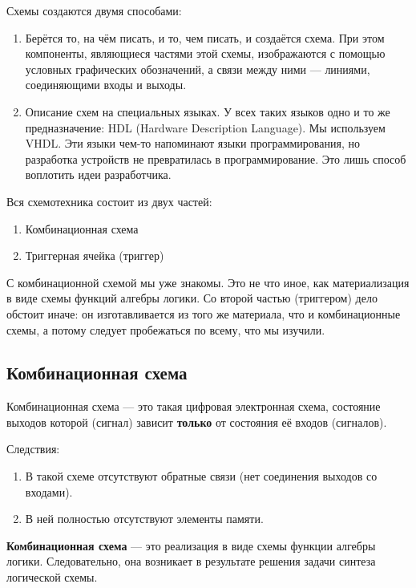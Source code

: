 \documentclass[12px]{article}
\begin{document}
Схемы создаются двумя способами:
\begin{enumerate}
	\item Берётся то, на чём писать, и то, чем писать, и создаётся схема. При этом компоненты, являющиеся частями этой схемы, изображаются с помощью условных графических обозначений, а связи между ними — линиями, соединяющими входы и выходы.
	\item Описание схем на специальных языках. У всех таких языков одно и то же предназначение: HDL (Hardware Description Language). Мы используем VHDL. Эти языки чем-то напоминают языки программирования, но разработка устройств не превратилась в программирование. Это лишь способ воплотить идеи разработчика.
\end{enumerate}

Вся схемотехника состоит из двух частей:
\begin{enumerate}
	\item Комбинационная схема
	\item Триггерная ячейка (триггер)
\end{enumerate}

С комбинационной схемой мы уже знакомы. Это не что иное, как материализация в виде схемы функций алгебры логики.  
Со второй частью (триггером) дело обстоит иначе: он изготавливается из того же материала, что и комбинационные схемы, а потому следует пробежаться по всему, что мы изучили.

\subsection{Комбинационная схема}

Комбинационная схема — это такая цифровая электронная схема, состояние выходов которой (сигнал) зависит \textbf{только} от состояния её входов (сигналов).

Следствия:
\begin{enumerate}
	\item В такой схеме отсутствуют обратные связи (нет соединения выходов со входами).
	\item В ней полностью отсутствуют элементы памяти.
\end{enumerate}

\textbf{Комбинационная схема} — это реализация в виде схемы функции алгебры логики. Следовательно, она возникает в результате решения задачи синтеза логической схемы.
\end{document}
